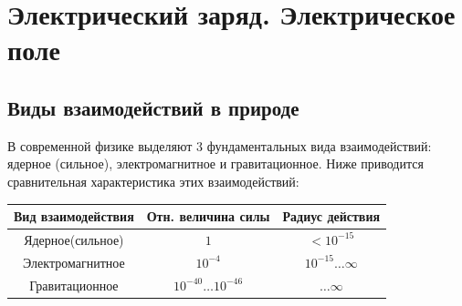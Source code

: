 \chapter{Электрический заряд. Электрическое поле}
\section{Виды взаимодействий в природе}
    В современной физике выделяют 3 фундаментальных вида взаимодействий:
    ядерное (сильное), электромагнитное и гравитационное. Ниже приводится
    сравнительная характеристика этих взаимодействий:

    \begin{table}[h]
        \center
        \begin{tabular}[c]{|c|c|c|}\hline
            Вид взаимодействия & Отн. величина силы
            & Радиус действия \\ \hline
            Ядерное(сильное) & \(1\) & \(<10^{-15}\) \\ \hline

            Электромагнитное & \(10^{-4}\) & \(10^{-15} \ldots \infty\)
            \\ \hline

            Гравитационное & \(10^{-40} \ldots 10^{-46}\) & \(\ldots \infty\)
            \\ \hline
        \end{tabular}
    \end{table}

